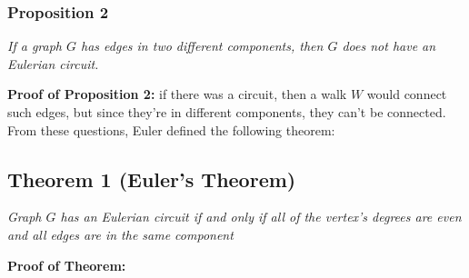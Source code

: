 \documentclass{report}
\begin{document}
\subsubsection{Proposition 2}
\begin{center}
\textit{If a graph $G$ has edges in two different components, then $G$ does not have an Eulerian circuit.}
\end{center}
\textbf{Proof of Proposition 2:} if there was a circuit, then a walk $W$ would connect such edges, but since they're in different components, they can't be connected.\\
From these questions, Euler defined the following theorem:
\subsection{Theorem 1 (Euler's Theorem)}
\begin{center}
\textit{Graph $G$ has an Eulerian circuit if and only if all of the vertex's degrees are even and all edges are in the same component}
\end{center}
\textbf{Proof of Theorem:}
\end{document}
